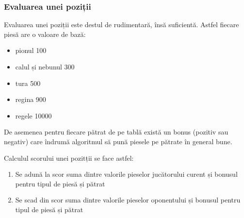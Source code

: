 \vspace{1cm}
\subsubsection{Evaluarea unei poziții}
\vspace{1cm}

Evaluarea unei poziții este destul de rudimentară, însă suficientă. Astfel fiecare piesă are o
valoare de bază:
\begin{itemize}
	\item pionul 100
	\item calul și nebunul 300
	\item tura 500
	\item regina 900
	\item regele 10000
\end{itemize}
De asemenea pentru fiecare pătrat de pe tablă există un bonus (pozitiv sau negativ) care
îndrumă algoritmul să pună piesele pe pătrate în general bune.

Calculul scorului unei pozitții se face astfel:
\begin{enumerate}
	\item Se adună la scor suma dintre valorile pieselor jucătorului curent și bonusul pentru
	      tipul de piesă și pătrat
	\item Se scad din scor suma dintre valorile pieselor oponentului și bonusul pentru
	      tipul de piesă și pătrat
\end{enumerate}

